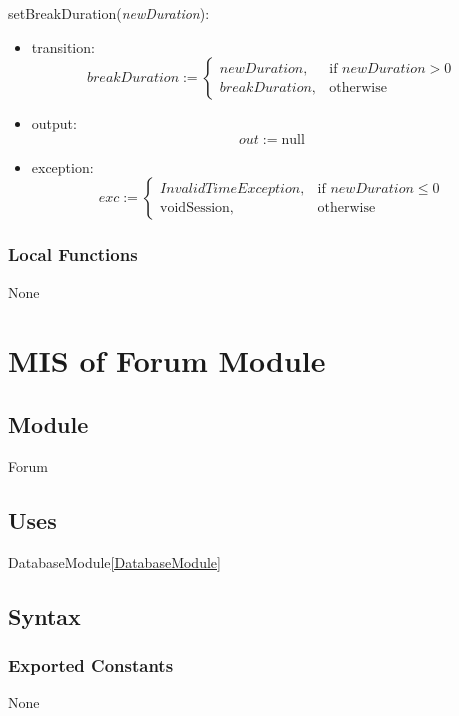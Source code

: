 \documentclass[12pt, titlepage]{article}
\begin{document}
\noindent setBreakDuration(\textit{newDuration}):
\begin{itemize}
\item transition: 
    \[
    breakDuration := \begin{cases} 
    newDuration, & \text{if } newDuration > 0 \\
    breakDuration, & \text{otherwise}
    \end{cases}
    \]
\item output: 
    \[
    out := \text{null}
    \]
\item exception: 
    \[
    exc := \begin{cases} 
    InvalidTimeException, & \text{if } newDuration \leq 0 \\
    \text{voidSession}, & \text{otherwise} 
    \end{cases}
    \]
\end{itemize}


\subsubsection{Local Functions}
None


\newpage
\section{MIS of Forum Module} \label{ForumModule}

\subsection{Module}
Forum

\subsection{Uses}
DatabaseModule\ref{DatabaseModule}

\subsection{Syntax}

\subsubsection{Exported Constants}
None
\end{document}

